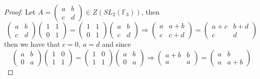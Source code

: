 \documentclass{article}
\newcommand{\F}{\mathbb{F}}
\begin{document}
\begin{proof}
    Let $A=\begin{pmatrix}
        a & b\\
        c & d 
    \end{pmatrix}\in Z(SL_2(\F_3))$, then 
    \[
    \begin{pmatrix}
        a & b \\
        c & d 
    \end{pmatrix}\begin{pmatrix}
        1 & 1 \\
        0 & 1
    \end{pmatrix}=\begin{pmatrix}
        1 & 1 \\
        0 & 1
    \end{pmatrix}    \begin{pmatrix}
        a & b \\
        c & d 
    \end{pmatrix} \Rightarrow \begin{pmatrix}
        a & a+b\\
        c & c+d
    \end{pmatrix}= \begin{pmatrix}
        a +c & b+d\\
        c & d
    \end{pmatrix}
    \]
    then we have that $c=0$, $a=d$ and since 
    \[
           \begin{pmatrix}
        a & b \\
        0 & a 
    \end{pmatrix}\begin{pmatrix}
        1 & 0 \\
        1 & 1
    \end{pmatrix}=\begin{pmatrix}
        1 & 0 \\
        1 & 1
    \end{pmatrix}    \begin{pmatrix}
        a & b \\
        0 & a 
    \end{pmatrix} \Rightarrow \begin{pmatrix}
        a+b & b\\
        a& a
    \end{pmatrix}= \begin{pmatrix}
        a  & b\\
        a & a+b
    \end{pmatrix}
\]
\end{proof}
\end{document}
